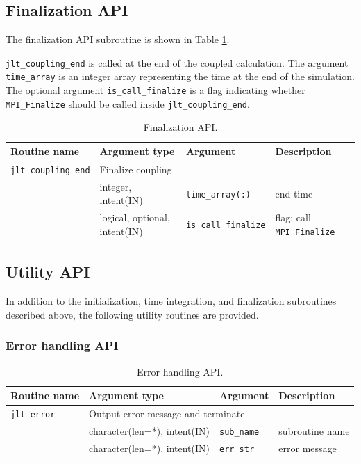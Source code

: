 \documentclass[11pt,a4paper]{report}
\newcommand{\tabref}[1]{Table \ref{#1}}
\begin{document}
\subsection{Finalization API}

The finalization API subroutine
is shown in \tabref{table:jlt_api_finalize}.

\texttt{jlt\_coupling\_end} is called
at the end of the coupled calculation.
The argument \texttt{time\_array} is an integer array
representing the time at the end of the simulation.
The optional argument \texttt{is\_call\_finalize} is a flag
indicating whether \texttt{MPI\_Finalize}
should be called inside \texttt{jlt\_coupling\_end}.

\begin{table}[H]
\begin{center}
\caption{Finalization API.}
{\small
\label{table:jlt_api_finalize}
\begin{tabular}{llll}
\hline\hline
Routine name & Argument type & Argument & Description \\
\hline
 \texttt{jlt\_coupling\_end} & \multicolumn{3}{l}{Finalize coupling}\\
           &  integer, intent(IN) &  \texttt{time\_array(:)}
             & end time\\
           &  logical, optional, intent(IN) &  \texttt{is\_call\_finalize}
             & flag: call \texttt{MPI\_Finalize}\\
\hline\hline
\end{tabular}
}
\end{center}
\end{table}


\subsection{Utility API}

In addition to the initialization, time integration,
and finalization subroutines described above,
the following utility routines are provided.

\subsubsection{Error handling API}

\begin{table}[H]
\begin{center}
\caption{Error handling API.}
{\small
\label{table:jlt_api_error}
\begin{tabular}{llll}
\hline\hline
Routine name & Argument type & Argument & Description \\
\hline
 \texttt{jlt\_error} & \multicolumn{3}{l}{Output error message and terminate}\\
           &  character(len=*), intent(IN) &  \texttt{sub\_name} & subroutine name\\
           &  character(len=*), intent(IN) &  \texttt{err\_str} & error message\\
\hline\hline
\end{tabular}
}
\end{center}
\end{table}
\end{document}
